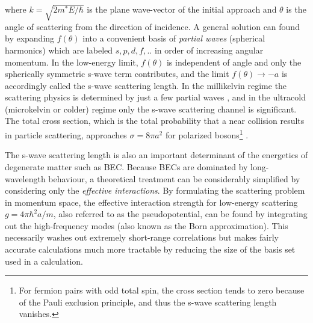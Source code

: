 	where $k=\sqrt{2m^*E/\hbar}$ is the plane wave-vector of the initial approach and $\theta$ is the angle of scattering from the direction of incidence.
	A general solution can found by expanding $f(\theta)$ into a convenient basis of \emph{partial waves} (spherical harmonics) which are labeled $s,p,d,f,..$ in order of increasing angular momentum.
	In the low-energy limit, $f(\theta)$ is independent of angle and only the spherically symmetric s-wave term contributes, and the limit $f(\theta)\rightarrow-a$ is accordingly called the s-wave scattering length.
	In the millikelvin regime the scattering physics is determined by just a few partial waves \cite{McNamara07}, and in the ultracold (microkelvin or colder) regime only the s-wave scattering channel is significant.
	The total cross section, which is the total probability that a near collision results in particle scattering, approaches $\sigma=8\pi a^2$ for polarized bosons\footnote{For fermion pairs with odd total spin, the cross section tends to zero because of the Pauli exclusion principle, and thus the s-wave scattering length vanishes.} \cite{PitaevskiiStringari,Przybytek05}.
	

	The s-wave scattering length is also an important determinant of the energetics of degenerate matter such as BEC.
	Because BECs are dominated by long-wavelength behaviour, a theoretical treatment can be considerably simplified by considering only the \emph{effective interactions}.
	By formulating the scattering problem in momentum space, the effective interaction strength for low-energy scattering  $g=4\pi \hbar^2 a/m$, also referred to as the pseudopotential, can be found by integrating out the high-frequency modes (also known as the Born approximation).
	This necessarily washes out extremely short-range correlations but makes fairly accurate calculations much more tractable by reducing the size of the basis set used in a calculation.

